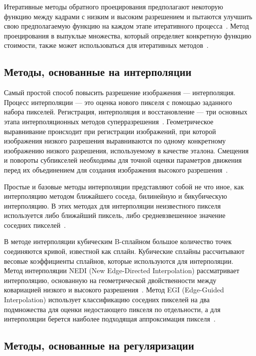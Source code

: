 \documentclass{bmstu}
\begin{document}
Итеративные методы обратного проецирования предполагают некоторую функцию между кадрами с низким и высоким разрешением и пытаются улучшить свою предполагаемую функцию на каждом этапе итеративного процесса~\cite{Cohen2000}. 
Метод проецирования в выпуклые множества, который определяет конкретную функцию стоимости, также может использоваться для итеративных методов~\cite{Katsaggelos1997}.

\subsection{Методы, основанные на интерполяции}

Самый простой способ повысить разрешение изображения --- интерполяция. 
Процесс интерполяции --- это оценка нового пикселя с помощью заданного набора пикселей. 
Регистрация, интерполяция и восстановление --- три основных этапа интерполяционных методов суперразрешения~\cite{Thapa2016}. 
Геометрическое выравнивание происходит при регистрации изображений, при которой изображения низкого разрешения выравниваются по одному конкретному изображению низкого разрешения, используемому в качестве эталона. 
Смещения и повороты субпикселей необходимы для точной оценки параметров движения перед их объединением для создания изображения высокого разрешения~\cite{Daithankar2021}.

Простые и базовые методы интерполяции представляют собой не что иное, как интерполяцию методом ближайшего соседа, билинейную и бикубическую интерполяцию. 
В этих методах для интерполяции неизвестного пикселя используется либо ближайший пиксель, либо средневзвешенное значение соседних пикселей~\cite{Daithankar2021}.

В методе интерполяции кубическим B-сплайном большое количество точек соединяются кривой, известной как сплайн. 
Кубические сплайны рассчитывают весовые коэффициенты сплайнов, которые используются для интерполяции. 
Метод интерполяции NEDI (New Edge-Directed Interpolation) рассматривает интерполяцию, основанную на геометрической двойственности между ковариацией низкого и высокого разрешения~\cite{Daithankar2021}. 
Метод EGI (Edge-Guided Interpolation) использует классификацию соседних пикселей на два подмножества для оценки недостающего пикселя по отдельности, а для интерполяции берется наиболее подходящая аппроксимация пикселя~\cite{Zhang2006}.

\subsection{Методы, основанные на регуляризации}
\end{document}
